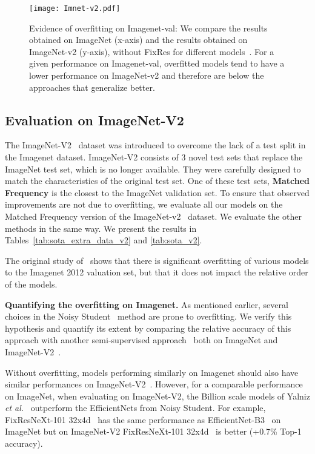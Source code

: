 \documentclass{article}
\newcommand{\etal}{\emph{et al.}}
\begin{document}
\begin{figure}
\begin{center}
\texttt{[image: Imnet-v2.pdf]}
\end{center}\caption{\label{fig:ImageNetv2_org}
Evidence of overfitting on Imagenet-val: We compare the results obtained on ImageNet (x-axis) and the results obtained on ImageNet-v2 (y-axis), without FixRes for different models~\cite{Zoph2018LearningTA,Liu2018PNAS,Xie2019SelftrainingWN,Radosavovic2020DesigningND,cubuk2019randaugment,Yalniz2019BillionscaleSL,He2016ResNet,Touvron2019FixRes}. 
For a given performance on Imagenet-val, overfitted models tend to have a lower performance on ImageNet-v2 and therefore are below the approaches that  generalize better. 
}
\end{figure}

\subsection{Evaluation on ImageNet-V2}
\label{sec:ImageNet_V2}

The ImageNet-V2~\cite{Recht2019DoIC} dataset was introduced to overcome the lack of a test split in the Imagenet dataset. 
ImageNet-V2 consists of 3 novel test sets that replace the ImageNet test set, which is no longer available. 
They were carefully designed to match the characteristics of the original test set.
One of these test sets, \textbf{Matched Frequency} is the closest to the ImageNet validation set. To ensure that observed improvements are not due to overfitting, we evaluate all our models on the Matched Frequency version of the ImageNet-v2~\cite{Recht2019DoIC} dataset.
We evaluate the other methods in the same way. 
We present the results in Tables~\ref{tab:sota_extra_data_v2} and \ref{tab:sota_v2}.

The original study of~\cite{Recht2019DoIC} shows that there is significant overfitting of various models to the Imagenet 2012 valuation set, but that it does not impact the relative order of the models.

\bigskip \noindent
\textbf{Quantifying the overfitting on Imagenet.} 
As mentioned earlier, 
several choices in the Noisy Student~\cite{Xie2019SelftrainingWN} method are prone to overfitting. 
We verify this hypothesis and quantify its extent by comparing the relative accuracy of this approach with another semi-supervised approach~\cite{Yalniz2019BillionscaleSL} both on ImageNet and ImageNet-V2~\cite{Recht2019DoIC}. 

Without overfitting, models performing similarly on Imagenet should also have  similar performances on ImageNet-V2~\cite{Recht2019DoIC}. However, for a comparable performance on ImageNet, when evaluating on ImageNet-V2, the Billion scale models of Yalniz \etal ~\cite{Yalniz2019BillionscaleSL} outperform  the EfficientNets from Noisy Student. 
For example, FixResNeXt-101 32x4d~\cite{Touvron2019FixRes} has the same performance as EfficientNet-B3~\cite{Xie2019SelftrainingWN} on ImageNet but on ImageNet-V2 FixResNeXt-101 32x4d~\cite{Touvron2019FixRes} is better (+0.7\% Top-1 accuracy). 
\end{document}
